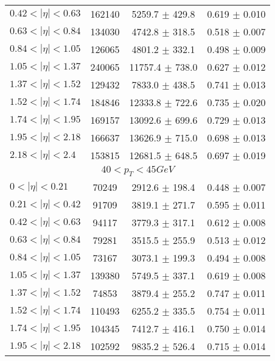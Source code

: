 \begin{tabular}{lccc}
$0.42 < |\eta| <0.63$          & 162140     & 5259.7     $\pm$ 429.8 & 0.619      $\pm$ 0.010 \\
$0.63 < |\eta| <0.84$          & 134030     & 4742.8     $\pm$ 318.5 & 0.518      $\pm$ 0.007 \\
$0.84 < |\eta| <1.05$          & 126065     & 4801.2     $\pm$ 332.1 & 0.498      $\pm$ 0.009 \\
$1.05 < |\eta| <1.37$          & 240065     & 11757.4    $\pm$ 738.0 & 0.627      $\pm$ 0.012 \\
$1.37 < |\eta| <1.52$          & 129432     & 7833.0     $\pm$ 438.5 & 0.741      $\pm$ 0.013 \\
$1.52 < |\eta| <1.74$          & 184846     & 12333.8    $\pm$ 722.6 & 0.735      $\pm$ 0.020 \\
$1.74 < |\eta| <1.95$          & 169157     & 13092.6    $\pm$ 699.6 & 0.729      $\pm$ 0.013 \\
$1.95 < |\eta| <2.18$          & 166637     & 13626.9    $\pm$ 715.0 & 0.698      $\pm$ 0.013 \\
$2.18 < |\eta| <2.4$           & 153815     & 12681.5    $\pm$ 648.5 & 0.697      $\pm$ 0.019 \\
\hline
\multicolumn{4}{c}{$40 < p_{T} < 45 GeV$} \\
\hline
$0 < |\eta| <0.21$             & 70249      & 2912.6     $\pm$ 198.4 & 0.448      $\pm$ 0.007 \\
$0.21 < |\eta| <0.42$          & 91709      & 3819.1     $\pm$ 271.7 & 0.595      $\pm$ 0.011 \\
$0.42 < |\eta| <0.63$          & 94117      & 3779.3     $\pm$ 317.1 & 0.612      $\pm$ 0.008 \\
$0.63 < |\eta| <0.84$          & 79281      & 3515.5     $\pm$ 255.9 & 0.513      $\pm$ 0.012 \\
$0.84 < |\eta| <1.05$          & 73167      & 3073.1     $\pm$ 199.3 & 0.494      $\pm$ 0.008 \\
$1.05 < |\eta| <1.37$          & 139380     & 5749.5     $\pm$ 337.1 & 0.619      $\pm$ 0.008 \\
$1.37 < |\eta| <1.52$          & 74853      & 3879.4     $\pm$ 255.2 & 0.747      $\pm$ 0.011 \\
$1.52 < |\eta| <1.74$          & 110493     & 6255.2     $\pm$ 335.5 & 0.754      $\pm$ 0.011 \\
$1.74 < |\eta| <1.95$          & 104345     & 7412.7     $\pm$ 416.1 & 0.750      $\pm$ 0.014 \\
$1.95 < |\eta| <2.18$          & 102592     & 9835.2     $\pm$ 526.4 & 0.715      $\pm$ 0.014 \\

\end{tabular}
